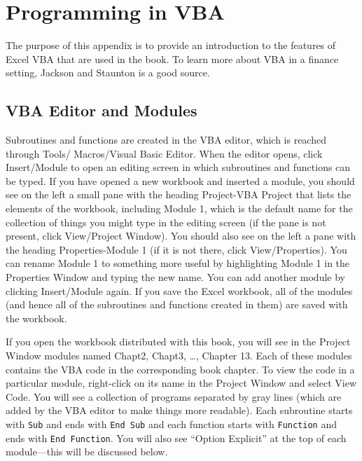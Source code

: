 \chapter{Programming in VBA}\label{c_matlab}

The purpose of this appendix is to provide an introduction to the features of Excel VBA that are used in the book.   To learn more about VBA in a finance setting, Jackson and Staunton \cite{JS} is a good source.

\section{VBA Editor and Modules}



Subroutines and functions are created in the VBA editor, which is reached through Tools/ Macros/Visual Basic Editor.    When the editor opens, click Insert/Module to open an editing screen in which subroutines and functions can be typed.   If you have opened a new workbook and  inserted a module, you should see on the left a small pane with the heading Project-VBA Project that lists the elements of the workbook, including Module 1, which is the default name for the collection of things you might type in the editing screen (if the pane is not present, click View/Project Window).  You should also see on the left a pane with the heading Properties-Module 1 (if it is not there, click View/Properties).  You can rename Module 1 to something more useful by highlighting Module 1 in the Properties Window and typing the new name.  You can add another module by clicking Insert/Module again.  If you save the Excel workbook, all of the modules (and hence all of the subroutines and functions created in them) are saved with the workbook.  

If you open the workbook distributed with this book, you will see in the Project Window modules named Chapt2, Chapt3, \ldots, Chapter 13.  Each of these modules contains the VBA code in the corresponding book chapter.  To view the code in a particular module, right-click on its name in the Project Window and select View Code.  You will see a collection of programs separated by gray lines (which are added by the VBA editor to make things more readable).  Each subroutine starts with \verb!Sub! and ends with \verb!End Sub! and each function starts with \verb!Function! and ends with \verb!End Function!.  You will also see ``Option Explicit'' at the top of each module---this will be discussed below.


